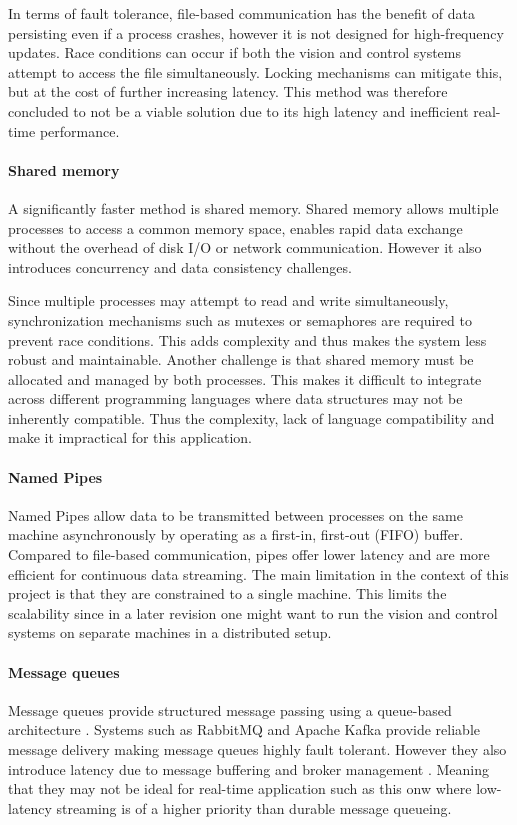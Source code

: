 In terms of fault tolerance, file-based communication has the benefit of data persisting even if a process crashes, however it is not designed for high-frequency updates. Race conditions can occur if both the vision and control systems attempt to access the file simultaneously. Locking mechanisms can mitigate this, but at the cost of further increasing latency. This method was therefore concluded to not be a viable solution due to its high latency and inefficient real-time performance.

\paragraph*{Shared memory}
A significantly faster method is shared memory. Shared memory allows multiple processes to access a common memory space, enables rapid data exchange without the overhead of disk I/O or network communication. However it also introduces concurrency and data consistency challenges. 

Since multiple processes may attempt to read and write simultaneously, synchronization mechanisms such as mutexes or semaphores are required to prevent race conditions. This adds complexity and thus makes the system less robust and maintainable. Another challenge is that shared memory must be allocated and managed by both processes. This makes it difficult to integrate across different programming languages where data structures may not be inherently compatible. Thus the complexity, lack of language compatibility and make it impractical for this application.

\paragraph*{Named Pipes}
Named Pipes allow data to be transmitted between processes on the same machine asynchronously by operating as a first-in, first-out (FIFO) buffer. Compared to file-based communication, pipes offer lower latency and are more efficient for continuous data streaming. The main limitation in the context of this project is that they are constrained to a single machine. This limits the scalability since in a later revision one might want to run the vision and control systems on separate machines in a distributed setup. 

\paragraph*{Message queues}
Message queues provide structured message passing using a queue-based architecture . Systems such as RabbitMQ and Apache Kafka provide reliable message delivery making message queues highly fault tolerant. However they also introduce latency due to message buffering and broker management . Meaning that they may not be ideal for real-time application such as this onw where low-latency streaming is of a higher priority than durable message queueing.

